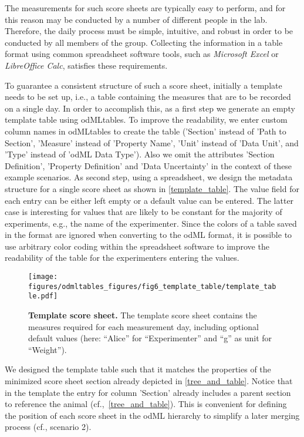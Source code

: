 The measurements for such score sheets are typically easy to perform, and for this reason may be conducted by a number of different people in the lab. Therefore, the daily process must be simple, intuitive, and robust in order to be conducted by all members of the group. Collecting the information in a table format using common spreadsheet software tools, such as \textit{Microsoft Excel} or \textit{LibreOffice Calc}, satisfies these requirements. 

To guarantee a consistent structure of such a score sheet, initially a template needs to be set up, i.e., a table containing the measures that are to be recorded on a single day. In order to accomplish this, as a first step we generate an empty template table using odMLtables. To improve the readability, we enter custom column names in odMLtables to create the table ('Section' instead of 'Path to Section', 'Measure' instead of 'Property Name', 'Unit' instead of 'Data Unit', and 'Type' instead of 'odML Data Type'). Also we omit the attributes 'Section Definition', 'Property Definition' and 'Data Uncertainty' in the context of these example scenarios. As second step, using a spreadsheet, we design the metadata structure for a single score sheet as shown in \cref{template_table}. The value field for each entry can be either left empty or a default value can be entered. The latter case is interesting for values that are likely to be constant for the majority of experiments, e.g., the name of the experimenter. Since the colors of a table saved in the  format are ignored when converting to the odML format, it is possible to use arbitrary color coding within the spreadsheet software to improve the readability of the table for the experimenters entering the values.

\begin{figure}[h!]
\begin{center}
\texttt{[image: figures/odmltables\_figures/fig6\_template\_table/template\_table.pdf]}
\caption{\label{fig:template_table}
\textbf{Template score sheet.} The template score sheet contains the measures required for each measurement day, including optional default values (here: ``Alice'' for ``Experimenter'' and ``g'' as unit for ``Weight'').}
\end{center}
\end{figure}

We designed the template table such that it matches the properties of the minimized score sheet section already depicted in \cref{tree_and_table}. Notice that in the template the entry for column 'Section' already includes a parent section to reference the animal (cf.,~\cref{tree_and_table}). This is convenient for defining the position of each score sheet in the odML hierarchy to simplify a later merging process (cf., scenario 2).

